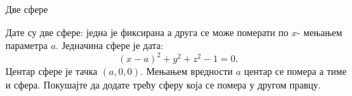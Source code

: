 \documentclass[sr]{./../../common/SurferDesc}%
\begin{document}
\footnotesize
%
\begin{surferPage}
  \begin{surferTitle} Две сфере\end{surferTitle}
   \begin{surferText}   
   
Дате су две сфере: једна је фиксирана а друга се може померати по $x$- мењањем параметра $a$.
Једначина сфере је дата:
\[(x-a)^2+y^2+z^2-1=0.\]
Центар сфере је тачка $(a,0,0)$. Мењањем вредности $a$ центар се помера а тиме и сфера.
Покушајте да додате трећу сферу која се помера у другом правцу.
     \end{surferText}
\end{surferPage}
\end{document}
